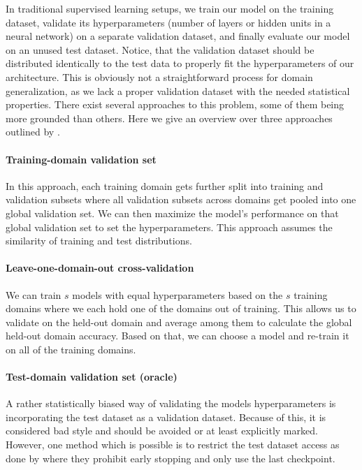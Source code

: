 In traditional supervised learning setups, we train our model on the training dataset, validate its hyperparameters (\eg number of layers or hidden units in a neural network) on a separate validation dataset, and finally evaluate our model on an unused test dataset. Notice, that the validation dataset should be distributed identically to the test data to properly fit the hyperparameters of our architecture. This is obviously not a straightforward process for domain generalization, as we lack a proper validation dataset with the needed statistical properties. There exist several approaches to this problem, some of them being more grounded than others. Here we give an overview over three approaches outlined by \citet{gulrajani2020search}. 

\paragraph{Training-domain validation set} 
In this approach, each training domain gets further split into training and validation subsets where all validation subsets across domains get pooled into one global validation set. We can then maximize the model's performance on that global validation set to set the hyperparameters. This approach assumes the similarity of training and test distributions.

\paragraph{Leave-one-domain-out cross-validation}
We can train $s$ models with equal hyperparameters based on the $s$ training domains where we each hold one of the domains out of training. This allows us to validate on the held-out domain and average among them to calculate the global held-out domain accuracy. Based on that, we can choose a model and re-train it on all of the training domains. 

\paragraph{Test-domain validation set (oracle)}
A rather statistically biased way of validating the models hyperparameters is incorporating the test dataset as a validation dataset. Because of this, it is considered bad style and should be avoided or at least explicitly marked. However, one method which is possible is to restrict the test dataset access as done by \citet{gulrajani2020search} where they prohibit early stopping and only use the last checkpoint.   

